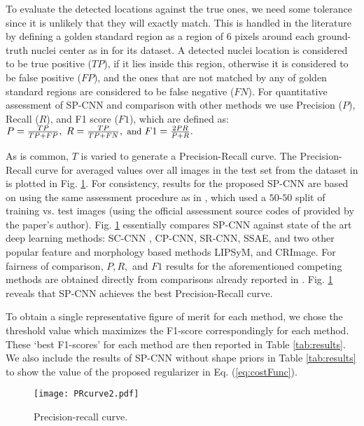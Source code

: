 \documentclass{article}
\begin{document}
To evaluate the detected locations against the true ones, we need some tolerance since it is unlikely that they will exactly match.
This is handled in the literature by defining a golden standard region as a region of 6 pixels around each ground-truth nuclei center as in \cite{SC_CNN} for its dataset. A detected nuclei location is considered to be true positive ($TP$), if it lies inside this region, otherwise it is considered to be false positive ($FP$), and the ones that are not matched by any of golden standard regions are considered to be false negative ($FN$). For quantitative assessment of SP-CNN and comparison with other methods we use Precision ($P$), Recall ($R$), and F1 score ($F1$), which are defined as:
$\small P = \frac{TP}{TP + FP}, ~R = \frac{TP}{TP + FN}, ~\text{and}~ F1 = \frac{2PR}{P+R}.$

As is common, $T$ is varied to generate a Precision-Recall curve. The Precision-Recall curve for averaged values over all images in the test set from the dataset in \cite{SC_CNN} is plotted in Fig. \ref{fig:PRcurve}.
For consistency, results for the proposed SP-CNN are based on using the same assessment procedure as in \cite{SC_CNN}, which used a $50\text{-}50$ split of training vs. test images (using the official assessment source codes of \cite{SC_CNN} provided by the paper's author). Fig. \ref{fig:PRcurve} essentially compares SP-CNN against state of the art deep learning methods: SC-CNN \cite{SC_CNN}, CP-CNN\cite{SC_CNN}, SR-CNN\cite{Xie2015}, SSAE\cite{Xu2016}, and two other popular feature and morphology based methods LIPSyM\cite{LIPSyM}, and CRImage\cite{CRImage}.
For fairness of comparison, $P, R,$ and $F1$ results for the aforementioned competing methods are obtained directly from comparisons already reported in \cite{SC_CNN}. 
 Fig. \ref{fig:PRcurve} reveals that SP-CNN achieves the best Precision-Recall curve. 

To obtain a single representative figure of merit for each method, we chose the threshold value which maximizes the F1-score correspondingly for each method. These `best F1-scores' for each method are then reported in Table \ref{tab:results}. We also include the results of SP-CNN without shape priors in Table \ref{tab:results} to show the value of the proposed regularizer in Eq. (\ref{eq:costFunc}). 

\begin{figure}[t]
	\centering
	\texttt{[image: PRcurve2.pdf]}\vspace{-1mm}
	\caption{\ninept Precision-recall curve.}
	\label{fig:PRcurve}\vspace{-5pt}
\end{figure}
\end{document}
